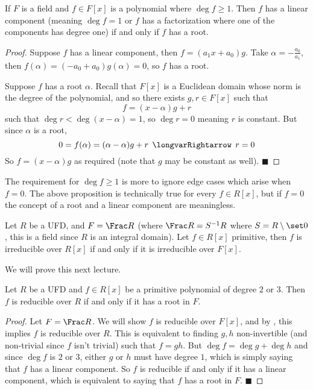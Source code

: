 \documentclass[10pt]{article}
\def\implies{\,\mathrel{\longvarRightarrow}\,}
\def\qed{\hskip1cm\hbox{}\hfill$\blacksquare$}
\begin{document}
\begin{prop*}

    If $F$ is a field and $f\in F[x]$ is a polynomial where $\deg f\geq1$.
    Then $f$ has a linear component (meaning $\deg f=1$ or $f$ has a factorization where one of the components has degree one) if and only if $f$ has a root.

\end{prop*}

\begin{proof}

    Suppose $f$ has a linear component, then $f=(a_1x+a_0)g$.
    Take $\alpha=-\frac{a_0}{a_1}$, then $f(\alpha)=(-a_0+a_0)g(\alpha)=0$, so $f$ has a root.

    Suppose $f$ has a root $\alpha$.
    Recall that $F[x]$ is a Euclidean domain whose norm is the degree of the polynomial, and so there exists $g,r\in F[x]$ such that
    \[ f = (x-\alpha)g + r \]
    such that $\deg r<\deg(x-\alpha)=1$, so $\deg r=0$ meaning $r$ is constant.
    But since $\alpha$ is a root,
    \[ 0 = f(\alpha) = (\alpha-\alpha)g + r \implies r = 0 \]
    So $f=(x-\alpha)g$ as required (note that $g$ may be constant as well).
    \qed

\end{proof}

The requirement for $\deg f\geq1$ is more to ignore edge cases which arise when $f=0$.
The above proposition is technically true for every $f\in R[x]$, but if $f=0$ the concept of a root and a linear component are meaningless.

\begin{lemm*}

    Let $R$ be a UFD, and $F=\Frac R$ (where $\Frac R=S^{-1}R$ where $S=R\setminus\set0$, this is a field since $R$ is an integral domain).
    Let $f\in R[x]$ primitive, then $f$ is irreducible over $R[x]$ if and only if it is irreducible over $F[x]$.

\end{lemm*}

We will prove this next lecture.

\begin{coro*}

    Let $R$ be a UFD and $f\in R[x]$ be a primitive polynomial of degree $2$ or $3$.
    Then $f$ is reducible over $R$ if and only if it has a root in $F$.

\end{coro*}

\begin{proof}

    Let $F=\Frac R$.
    We will show $f$ is reducible over $F[x]$, and by , this implies $f$ is reducible over $R$.
    This is equivalent to finding $g,h$ non-invertible (and non-trivial since $f$ isn't trivial) such that $f=gh$.
    But $\deg f=\deg g+\deg h$ and since $\deg f$ is $2$ or $3$, either $g$ or $h$ must have degree $1$, which is simply saying that $f$ has a linear component.
    So $f$ is reducible if and only if it has a linear component, which is equivalent to saying that $f$ has a root in $F$.
    \qed

\end{proof}
\end{document}
